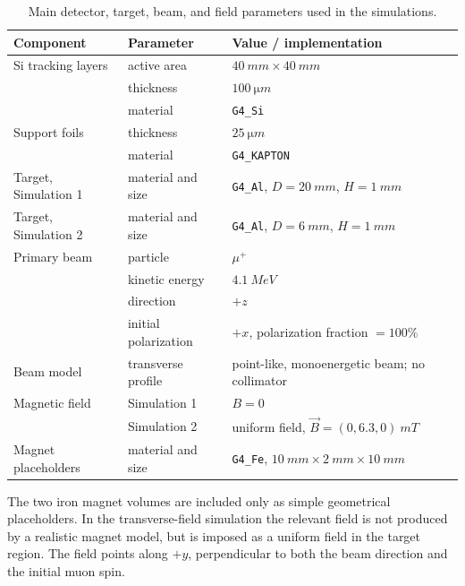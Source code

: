 \documentclass[11pt,a4paper]{article}
\begin{document}
\begin{table}[ht]
\centering
\caption{Main detector, target, beam, and field parameters used in the simulations.}
\label{tab:sim_parameters}
\begin{tabular}{lll}
\toprule
Component & Parameter & Value / implementation \\
\midrule
Si tracking layers & active area & $40~\si{mm}\times40~\si{mm}$ \\
  & thickness
  & $100~\si{\micro m}$ \\
  & material
  & \texttt{G4\_Si} \\

Support foils
  & thickness
  & $25~\si{\micro m}$ \\
  & material
  & \texttt{G4\_KAPTON} \\

Target, Simulation 1
  & material and size
  & \texttt{G4\_Al}, $D=\SI{20}{mm}$, $H=\SI{1}{mm}$ \\

Target, Simulation 2
  & material and size
  & \texttt{G4\_Al}, $D=\SI{6}{mm}$, $H=\SI{1}{mm}$ \\

Primary beam
  & particle
  & $\mu^+$ \\
  & kinetic energy
  & $\SI{4.1}{MeV}$ \\
  & direction
  & $+z$ \\
  & initial polarization
  & $+x$, polarization fraction $=100\%$ \\

Beam model
  & transverse profile
  & point-like, monoenergetic beam; no collimator \\

Magnetic field
  & Simulation 1
  & $B=0$ \\
  & Simulation 2
  & uniform field, $\vec{B}=(0,6.3,0)~\si{mT}$ \\

Magnet placeholders
  & material and size
  & \texttt{G4\_Fe}, $10~\si{mm}\times2~\si{mm}\times10~\si{mm}$ \\
\bottomrule
\end{tabular}
\end{table}


The two iron magnet volumes are included only as simple geometrical placeholders. In the transverse-field simulation the relevant field is not produced by a realistic magnet model, but is imposed as a uniform field in the target region. The field points along $+y$, perpendicular to both the beam direction and the initial muon spin.
\end{document}
